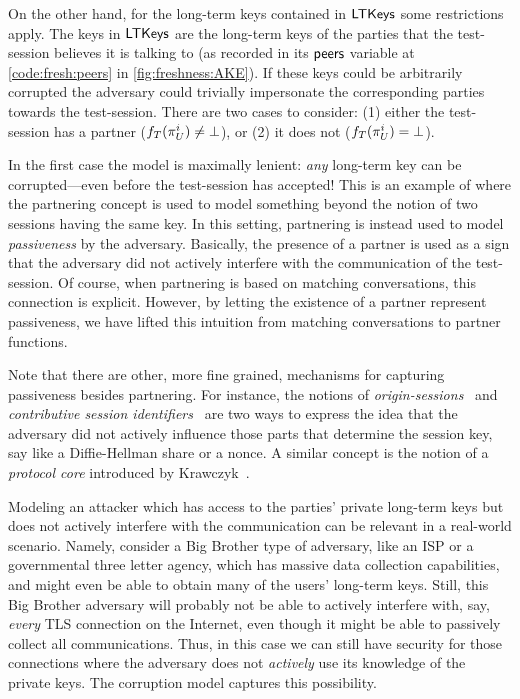 On the other hand,
for the long-term keys contained in $\mathsf{LTKeys}$ some restrictions apply.
The keys in $\mathsf{LTKeys}$ are the long-term keys of the parties that the test-session believes it is talking to (as recorded in its $\mathsf{peers}$ variable at \cref{code:fresh:peers} in \cref{fig:freshness:AKE}).
If these keys could be arbitrarily corrupted the adversary could trivially impersonate the corresponding parties towards the test-session.
There are two cases to consider:
(1) either the test-session has a partner ($f_T(\oracle[U][i]) \neq \bot$),
or (2) it does not 
($f_T(\oracle[U][i]) = \bot$).

In the first case the \akefstext model is maximally lenient:
\emph{any} long-term key can be corrupted---even before the test-session has accepted!
This is an example of where the partnering concept is used to model something beyond the notion of two sessions having the same key.
In this setting,
partnering is instead used to model \emph{passiveness} by the adversary.
Basically,
the presence of a partner is used as a sign that the adversary did not actively interfere with the communication of the test-session.
Of course,
when partnering is based on matching conversations,
this connection is explicit.
However,
by letting the existence of a partner represent passiveness,
we have lifted this intuition from matching conversations to partner functions.

\begin{remark}
Note that there are other,
more fine grained,
mechanisms for capturing passiveness besides partnering.
For instance,
the notions of \emph{origin-sessions}~\cite{ESORICS:CreFel12} and \emph{contributive session identifiers}~\cite{CCS:DFGS15} are two ways to express the idea that the adversary did not actively influence those parts that determine the session key,
say like a Diffie-Hellman share or a nonce.
A similar concept is the notion of a \emph{protocol core} introduced by Krawczyk~\cite{CCS:Krawczyk16}.
\end{remark}

\begin{example}
Modeling an attacker which has access to the parties' private long-term keys but does not actively interfere with the communication can be relevant in a real-world scenario.
Namely,
consider a Big Brother type of adversary,
like an ISP or a governmental three letter agency,
which has massive data collection capabilities,
and might even be able to obtain many of the users' long-term keys.
Still,
this Big Brother adversary will probably not be able to actively interfere with,
say,
\emph{every} TLS connection on the Internet,
even though it might be able to passively collect all communications.
Thus,
in this case we can still have security for those connections where the adversary does not \emph{actively} use its knowledge of the private keys.
The \akefstext corruption model captures this possibility.
\end{example}

